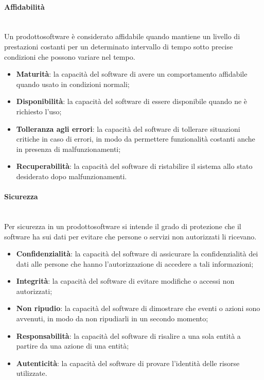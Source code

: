 	\paragraph{Affidabilità} \mbox{}\\
	Un prodotto\glosp software è considerato affidabile quando mantiene un livello di prestazioni costanti per un determinato intervallo di tempo sotto precise condizioni che possono variare nel tempo.
	\begin{itemize}
		\item \textbf{Maturità}: la capacità del software di avere un comportamento affidabile quando usato in condizioni normali;
		\item \textbf{Disponibilità}: la capacità del software di essere disponibile quando ne è richiesto l'uso;
		\item \textbf{Tolleranza agli errori}: la capacità del software di tollerare situazioni critiche in caso di errori, in modo da permettere funzionalità costanti anche in presenza di malfunzionamenti;
		\item \textbf{Recuperabilità}: la capacità del software di ristabilire il sistema allo stato desiderato dopo malfunzionamenti.
	\end{itemize}
	\paragraph{Sicurezza} \mbox{}\\
	Per sicurezza in un prodotto\glosp software si intende il grado di protezione che il software ha sui dati per evitare che persone o servizi non autorizzati li ricevano.
	\begin{itemize}
		\item \textbf{Confidenzialità}: la capacità del software di assicurare la confidenzialità dei dati alle persone che hanno l'autorizzazione di accedere a tali informazioni;
		\item \textbf{Integrità}: la capacità del software di evitare modifiche o accessi non autorizzati;
		\item \textbf{Non ripudio}: la capacità del software di dimostrare che eventi o azioni sono avvenuti, in modo da non ripudiarli in un secondo momento;
		\item \textbf{Responsabilità}: la capacità del software di risalire a una sola entità a partire da una azione di una entità;
		\item \textbf{Autenticità}: la capacità del software di provare l'identità delle risorse utilizzate.
	\end{itemize}
